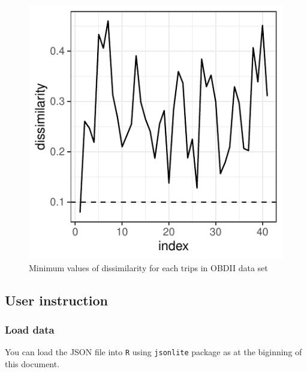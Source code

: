 \documentclass[letterpaper,9pt,twocolumn,twoside,]{pinp}
\begin{document}
\begin{figure}

{\centering \includegraphics{report_issaclee_files/figure-latex/dissimilarity-1} 

}

\caption{Minimum values of dissimilarity for each trips in OBDII data set}\label{fig:dissimilarity}
\end{figure}

\hypertarget{user-instruction}{%
\subsection{User instruction}\label{user-instruction}}

\hypertarget{load-data}{%
\subsubsection{Load data}\label{load-data}}

You can load the JSON file into \texttt{R} using \texttt{jsonlite}
package as at the biginning of this document.

\begin{Shaded}
\begin{Highlighting}[]

\StringTok{ }\NormalTok{(}\NormalTok{)}
\StringTok{ }\NormalTok{(}\NormalTok{)}
\end{Highlighting}
\end{Shaded}
\end{document}
